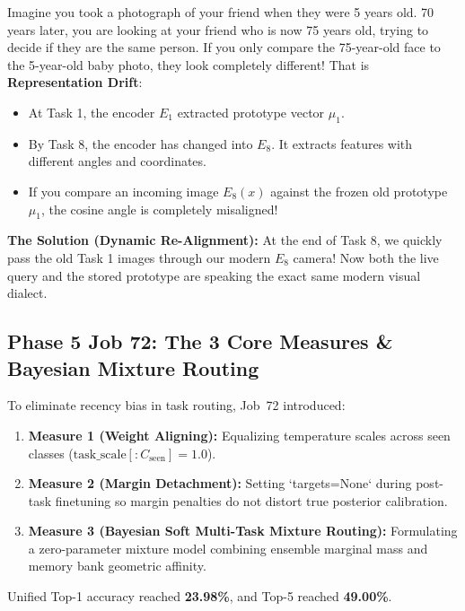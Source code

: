 \documentclass[11pt,a4paper]{article}
\begin{document}
\begin{callout}
Imagine you took a photograph of your friend when they were 5 years old. 70 years later, you are looking at your friend who is now 75 years old, trying to decide if they are the same person.
If you only compare the 75-year-old face to the 5-year-old baby photo, they look completely different! That is \textbf{Representation Drift}:
\begin{itemize}[noitemsep]
    \item At Task 1, the encoder $E_1$ extracted prototype vector $\mu_1$.
    \item By Task 8, the encoder has changed into $E_8$. It extracts features with different angles and coordinates.
    \item If you compare an incoming image $E_8(x)$ against the frozen old prototype $\mu_1$, the cosine angle is completely misaligned!
\end{itemize}
\textbf{The Solution (Dynamic Re-Alignment):} At the end of Task 8, we quickly pass the old Task 1 images through our modern $E_8$ camera! Now both the live query and the stored prototype are speaking the exact same modern visual dialect.
\end{callout}

\subsection{Phase 5 Job 72: The 3 Core Measures \& Bayesian Mixture Routing}
To eliminate recency bias in task routing, Job~72 introduced:
\begin{enumerate}[noitemsep]
    \item \textbf{Measure 1 (Weight Aligning):} Equalizing temperature scales across seen classes ($\text{task\_scale}[:C_{\text{seen}}] = 1.0$).
    \item \textbf{Measure 2 (Margin Detachment):} Setting `targets=None` during post-task finetuning so margin penalties do not distort true posterior calibration.
    \item \textbf{Measure 3 (Bayesian Soft Multi-Task Mixture Routing):} Formulating a zero-parameter mixture model combining ensemble marginal mass and memory bank geometric affinity.
\end{enumerate}
Unified Top-1 accuracy reached \textbf{23.98\%}, and Top-5 reached \textbf{49.00\%}.
\end{document}
